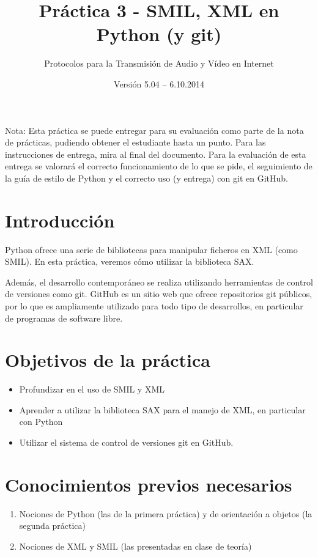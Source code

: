 \documentclass[11pt,a4paper]{article}
\begin{document}
\title{Práctica 3 - SMIL, XML en Python (y git)}
\author{Protocolos para la Transmisión de Audio y Vídeo en Internet}
\date{Versión 5.04 – 6.10.2014}


\maketitle


Nota: Esta práctica se puede entregar para su evaluación como parte de la nota de prácticas, pudiendo obtener el estudiante hasta un punto. Para las instrucciones de entrega, mira al final del documento. Para la evaluación de esta entrega se valorará el correcto funcionamiento de lo que se pide, el seguimiento de la guía de estilo de Python y el correcto uso (y entrega) con git en GitHub.

\section{Introducción}

Python ofrece una serie de bibliotecas para manipular ficheros en XML (como SMIL). En esta práctica, veremos cómo utilizar la biblioteca SAX.

Además, el desarrollo contemporáneo se realiza utilizando herramientas de control de versiones como git. GitHub es un sitio web que ofrece repositorios git públicos, por lo que es ampliamente utilizado para todo tipo de desarrollos, en particular de programas de software libre.

\section{Objetivos de la práctica}

\begin{itemize}
  \item Profundizar en el uso de SMIL y XML
  \item Aprender a utilizar la biblioteca SAX para el manejo de XML, en particular con Python
  \item Utilizar el sistema de control de versiones git en GitHub.
\end{itemize}

\section{Conocimientos previos necesarios}

\begin{enumerate}
  \item Nociones de Python (las de la primera práctica) y de orientación a objetos (la segunda práctica)
  \item Nociones de XML y SMIL (las presentadas en clase de teoría)
\end{enumerate}
\end{document}
